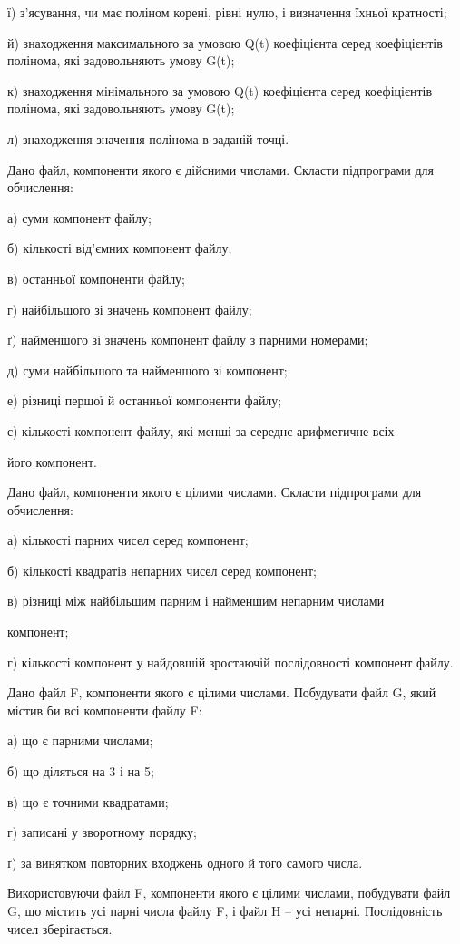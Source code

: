 \documentclass[]{article}
\begin{document}
ї) з'ясування, чи має поліном корені, рівні нулю, і визначення їхньої
кратності;

й) знаходження максимального за умовою Q(t) коефіцієнта серед
коефіцієнтів полінома, які задовольняють умову G(t);

к) знаходження мінімального за умовою Q(t) коефіцієнта серед
коефіцієнтів полінома, які задовольняють умову G(t);

л) знаходження значення полінома в заданій точці.

\protect\hypertarget{_Hlk65238097}{}{}Дано файл, компоненти якого є
дійсними числами. Скласти підпрограми для обчислення:

а) суми компонент файлу;

б) кількості від'ємних компонент файлу;

в) останньої компоненти файлу;

г) найбільшого зі значень компонент файлу;

ґ) найменшого зі значень компонент файлу з парними номерами;

д) суми найбільшого та найменшого зі компонент;

е) різниці першої й останньої компоненти файлу;

є) кількості компонент файлу, які менші за середнє арифметичне всіх

його компонент.

\protect\hypertarget{_Hlk65237989}{}{}Дано файл, компоненти якого є
цілими числами. Скласти підпрограми для обчислення:

а) кількості парних чисел серед компонент;

б) кількості квадратів непарних чисел серед компонент;

в) різниці між найбільшим парним і найменшим непарним числами

компонент;

г) кількості компонент у найдовшій зростаючій послідовності компонент
файлу.

Дано файл F, компоненти якого є цілими числами. Побудувати файл G, який
містив би всі компоненти файлу F:

а) що є парними числами;

б) що діляться на 3 і на 5;

в) що є точними квадратами;

г) записані у зворотному порядку;

ґ) за винятком повторних входжень одного й того самого числа.

Використовуючи файл F, компоненти якого є цілими числами, побудувати
файл G, що містить усі парні числа файлу F, і файл H -- усі непарні.
Послідовність чисел зберігається.
\end{document}
